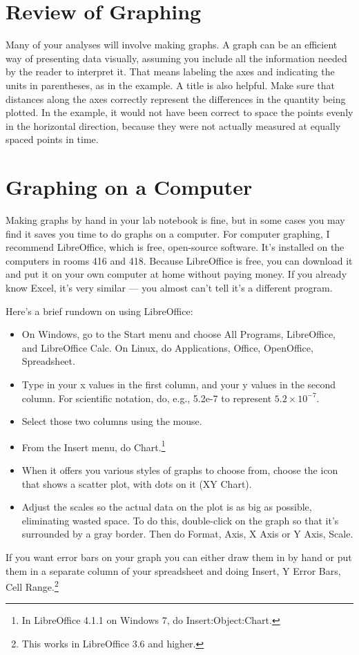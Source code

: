 
\section{Review of Graphing}
Many of your analyses will involve making graphs. A graph
can be an efficient way of presenting data visually,
assuming you include all the information needed by the
reader to interpret it. That means labeling the axes and
indicating the units in parentheses, as in the example. A
title is also helpful. Make sure that distances along the
axes correctly represent the differences in the quantity
being plotted. In the example, it would not have been
correct to space the points evenly in the horizontal
direction, because they were not actually measured at
equally spaced points in time. 



\section{Graphing on a Computer}
Making graphs by hand in your lab notebook is fine, but in
some cases you may find it saves you time to do graphs on a
computer. For computer graphing, I recommend LibreOffice, which
is free, open-source software. It's installed on the computers
in rooms 416 and 418. Because LibreOffice is free, you can download
it and put it on your own computer at home without paying money.
If you already know Excel, it's very similar --- you almost can't
tell it's a different program.

Here's a brief rundown on using LibreOffice:
\begin{itemize}
  \item[] On Windows, go to the Start menu and choose All Programs, LibreOffice, and LibreOffice Calc.
          On Linux, do Applications, Office, OpenOffice, Spreadsheet.
  \item[] Type in your x values in the first column, and your
  	y values in the second column. For scientific notation, do, e.g., 5.2e-7
        to represent $5.2\times10^{-7}$.
  \item[] Select those two columns using the mouse.
  \item[] From the Insert menu, do Chart.\footnote{In LibreOffice 4.1.1 on Windows 7, do Insert:Object:Chart.}
  \item[] When it offers you various styles of graphs to choose from, choose
          the icon that shows a scatter plot, with dots on it  (XY Chart).
  \item[] Adjust the scales so the actual data on the plot is as big as possible,
          eliminating wasted space. To do this, double-click on the graph so that it's
          surrounded by a gray border. Then do Format, Axis, X Axis or Y Axis, Scale.
\end{itemize}
If you want error bars on your graph you can either draw them in by hand or put them in a
separate column of your spreadsheet and doing Insert, Y Error Bars, Cell Range.\footnote{This works in
LibreOffice 3.6 and higher.}

